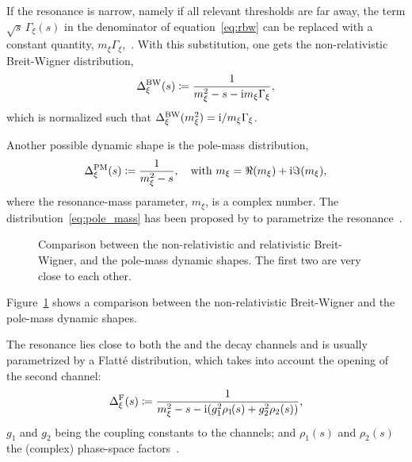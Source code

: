     If the resonance is narrow, namely if all relevant thresholds are far away, the term $\sqrt{s}\,\Gamma_\xi(s)$ in the denominator of equation~\eqref{eq:rbw} can be replaced with a constant quantity, $m_{\xi}\Gamma_{\xi}$,~\cite[\S~47.2.1]{chinese_phisics}.
    With this substitution, one gets the non-relativistic Breit-Wigner distribution,
    \begin{equation}\label{eq:bw}
        \Delta_{\xi}^{\text{BW}}(s) \coloneqq \frac{1}{m_{\xi}^2 - s - \mathrm{i} m_{\xi} \Gamma_{\xi}},
    \end{equation}
    which is normalized such that $\Delta_{\xi}^{\text{BW}}(m_{\xi}^2) = \mathrm{i} / m_\xi\Gamma_\xi$.


    Another possible dynamic shape is the pole-mass distribution,
    \begin{equation}\label{eq:pole_mass}
        \Delta_{\xi}^{\text{PM}}(s) \coloneqq \frac{1}{m_{\xi}^2 - s},\quad
        \text{with }m_\xi = \Re (m_\xi) + \mathrm{i}\Im(m_\xi),
    \end{equation}
    where the resonance-mass parameter, $m_\xi$, is a complex number.
    The distribution~\eqref{eq:pole_mass} has been proposed by \citeauthor{PhysRevD.71.054030} to parametrize the \Psigma{} resonance~\cite{PhysRevD.71.054030}.
    \begin{figure}
        \centering
        
        \caption{Comparison between the non-relativistic and relativistic Breit-Wigner, and the pole-mass dynamic shapes.
                 The first two are very close to each other.
        }
        \label{fig:bw_pm_comparison}
    \end{figure}
    Figure~\ref{fig:bw_pm_comparison} shows a comparison between the non-relativistic Breit-Wigner and the pole-mass dynamic shapes.

    
    The \Pfnez{} resonance lies close to both the \Ppiplus{}\Ppiminus{} and the \PKplus{}\PKminus{} decay channels and is usually parametrized by a Flatté distribution, which takes into account the opening of the second channel:
    \begin{equation}\label{eq:flatte}
        \Delta_{\xi}^{\text{F}}(s) \coloneqq \frac{1}{m_{\xi}^2 - s - \mathrm{i}(g_1^2 \rho_{1\!}(s)  + g_2^2 \rho_2(s))},
    \end{equation}
    $g_1$ and $g_2$ being the coupling constants to the channels;
    and $\rho_{1\!}(s)$ and $\rho_2(s)$ the (complex) phase-space factors~\cite{FLATTE1976224}.

